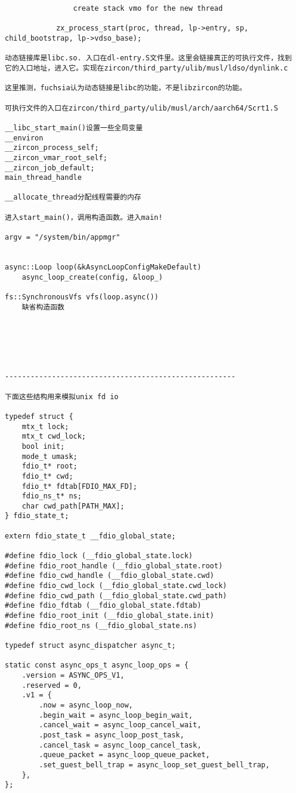 \begin{verbatim}
                create stack vmo for the new thread

            zx_process_start(proc, thread, lp->entry, sp, child_bootstrap, lp->vdso_base);

动态链接库是libc.so. 入口在dl-entry.S文件里。这里会链接真正的可执行文件，找到
它的入口地址，进入它。实现在zircon/third_party/ulib/musl/ldso/dynlink.c

这里推测，fuchsia认为动态链接是libc的功能，不是libzircon的功能。

可执行文件的入口在zircon/third_party/ulib/musl/arch/aarch64/Scrt1.S

__libc_start_main()设置一些全局变量
__environ
__zircon_process_self;
__zircon_vmar_root_self;
__zircon_job_default;
main_thread_handle

__allocate_thread分配线程需要的内存

进入start_main()，调用构造函数。进入main!

argv = "/system/bin/appmgr"


async::Loop loop(&kAsyncLoopConfigMakeDefault)
    async_loop_create(config, &loop_)
    
fs::SynchronousVfs vfs(loop.async())
    缺省构造函数






------------------------------------------------------

下面这些结构用来模拟unix fd io

typedef struct {
    mtx_t lock;
    mtx_t cwd_lock;
    bool init;
    mode_t umask;
    fdio_t* root;
    fdio_t* cwd;
    fdio_t* fdtab[FDIO_MAX_FD];
    fdio_ns_t* ns;
    char cwd_path[PATH_MAX];
} fdio_state_t;

extern fdio_state_t __fdio_global_state;

#define fdio_lock (__fdio_global_state.lock)
#define fdio_root_handle (__fdio_global_state.root)
#define fdio_cwd_handle (__fdio_global_state.cwd)
#define fdio_cwd_lock (__fdio_global_state.cwd_lock)
#define fdio_cwd_path (__fdio_global_state.cwd_path)
#define fdio_fdtab (__fdio_global_state.fdtab)
#define fdio_root_init (__fdio_global_state.init)
#define fdio_root_ns (__fdio_global_state.ns)

typedef struct async_dispatcher async_t;

static const async_ops_t async_loop_ops = {
    .version = ASYNC_OPS_V1,
    .reserved = 0,
    .v1 = {
        .now = async_loop_now,
        .begin_wait = async_loop_begin_wait,
        .cancel_wait = async_loop_cancel_wait,
        .post_task = async_loop_post_task,
        .cancel_task = async_loop_cancel_task,
        .queue_packet = async_loop_queue_packet,
        .set_guest_bell_trap = async_loop_set_guest_bell_trap,
    },
};


\end{verbatim}
